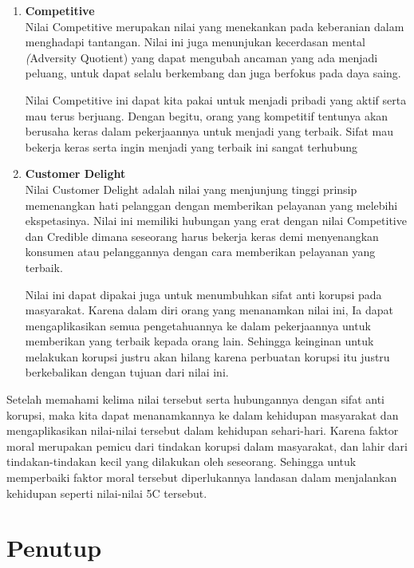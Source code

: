 \documentclass[11pt]{article}
\begin{document}
\begin{enumerate}
    \item \textbf{Competitive} \\
            Nilai Competitive merupakan nilai yang menekankan pada keberanian
            dalam menghadapi tantangan. Nilai ini juga menunjukan kecerdasan mental
            \emph(Adversity Quotient) yang dapat mengubah ancaman yang ada menjadi
            peluang, untuk dapat selalu berkembang dan juga berfokus pada daya
            saing. 

            Nilai Competitive ini dapat kita pakai untuk menjadi pribadi yang 
            aktif serta mau terus berjuang. Dengan begitu, orang yang kompetitif 
            tentunya akan berusaha keras dalam pekerjaannya untuk menjadi yang
            terbaik. Sifat mau bekerja keras serta ingin menjadi yang terbaik ini
            sangat terhubung 

    \item \textbf{Customer Delight} \\
            Nilai Customer Delight adalah nilai yang menjunjung tinggi prinsip
            memenangkan hati pelanggan dengan memberikan pelayanan yang melebihi 
            ekspetasinya. Nilai ini memiliki hubungan yang erat dengan nilai 
            Competitive dan Credible dimana seseorang harus bekerja keras demi 
            menyenangkan konsumen atau pelanggannya dengan cara memberikan 
            pelayanan yang terbaik. 

            Nilai ini dapat dipakai juga untuk menumbuhkan sifat anti korupsi 
            pada masyarakat. Karena dalam diri orang yang menanamkan nilai ini,
            Ia dapat mengaplikasikan semua pengetahuannya ke dalam pekerjaannya 
            untuk memberikan yang terbaik kepada orang lain. Sehingga keinginan
            untuk melakukan korupsi justru akan hilang karena perbuatan korupsi 
            itu justru berkebalikan dengan tujuan dari nilai ini.
\end{enumerate}

Setelah memahami kelima nilai tersebut serta hubungannya dengan sifat anti korupsi,
maka kita dapat menanamkannya ke dalam kehidupan masyarakat dan mengaplikasikan
nilai-nilai tersebut dalam kehidupan sehari-hari. Karena faktor moral merupakan
pemicu dari tindakan korupsi dalam masyarakat, dan lahir dari tindakan-tindakan kecil
yang dilakukan oleh seseorang. Sehingga untuk memperbaiki faktor moral tersebut
diperlukannya landasan dalam menjalankan kehidupan seperti nilai-nilai 5C tersebut.

\newpage
\section{Penutup}
\end{document}
